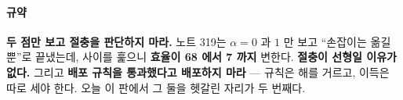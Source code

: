 \documentclass[10pt]{article}
\begin{document}
\paragraph{규약} \textbf{두 점만 보고 절충을 판단하지 마라.} 노트 319는
$\alpha{=}0$ 과 $1$ 만 보고 ``손잡이는 옮길 뿐''로 끝냈는데, 사이를 훑으니
\textbf{효율이 68 에서 7 까지} 변한다. \textbf{절충이 선형일 이유가 없다.}
그리고 \textbf{배포 규칙을 통과했다고 배포하지 마라} --- 규칙은 해를 거르고,
이득은 따로 세야 한다. 오늘 이 판에서 그 둘을 헷갈린 자리가 두 번째다.
\end{document}
